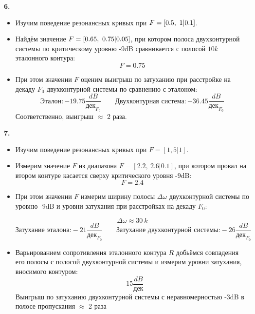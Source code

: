 \textbf{6.}
\begin{itemize}
 \item Изучим поведение резонансных кривых при $F \hm{=} [0.5,~1|0.1]$. 
 \item Найдём значение $F \hm{=} [0.65,~0.75|0.05]$, при котором полоса двухконтурной системы по критическому уровню -9dB сравнивается с полосой $10k$ эталонного контура: 
 \[
  F = 0.75
 \]

 \item При этом значении $F$ оценим выигрыш по затуханию при расстройке на декаду $F_0$ двухконтурной системы по сравнению с эталоном:
 \[
  \textit{Эталон}:  -19.75\frac{dB}{\text{дек}_{F_0}} \quad \quad \textit{Двухконтурная \ система}: -36.45\frac{dB}{\text{дек}_{F_0}} 
 \]
Соответственно, выигрыш $ \approx $ 2 раза.
\end{itemize}

\textbf{7.} 
\begin{itemize}
	\item Изучим поведение резонансных кривых при $F {=} [1,5|1]$.
	\item Измерим значение $F$ из диапазона $F = [2.2,~2.6|0.1]$, при котором провал на втором контуре касается сверху критического уровня -9dB:
	$$
	F = 2.4
	$$ 
	\item При этом значении $F$ измерим ширину полосы $\Delta \omega$ двухконтурной системы по уровню -9dB и уровни затухания при расстройках на декаду $F_0$: 
	
	\[
		\Delta \omega \approx 30 \ k 
	\]
	\[
		 \textit{Затухание эталона:} -21\frac{dB}{\text{дек}_{F_0}} \quad \quad \textit{Затухание двухконтурной системы:} -26\frac{dB}{\text{дек}_{F_0}}
	\]
	\item Варьированием сопротивления эталонного контура $R$ добьёмся совпадения его полосы с полосой двухконтурной системы и измерим уровни затухания, вносимого контуром:
	$$
	-15\frac{dB}{\text{дек}}
	$$
	Выигрыш по затуханию двухконтурной системы с неравномерностью -3dB в полосе пропускания $ \approx $ 2 раза

\end{itemize}


